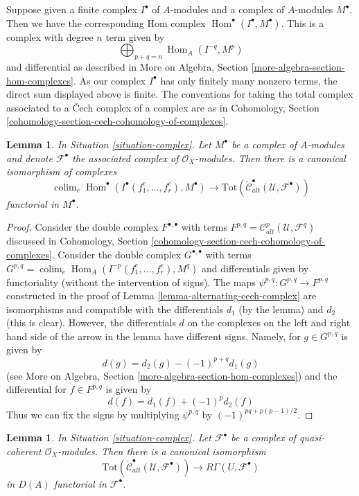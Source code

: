 \documentclass{stacks-project}
\theoremstyle{plain}
\newtheorem{lemma}[subsection]{Lemma}
\theoremstyle{definition}
\theoremstyle{remark}
\numberwithin{equation}{subsection}
\def\colim{\mathop{\mathrm{colim}}\nolimits}
\def\Hom{\mathop{\mathrm{Hom}}\nolimits}
\begin{document}
\noindent
Suppose given a finite complex $I^\bullet$ of $A$-modules and a
complex of $A$-modules $M^\bullet$. Then we have the corresponding
Hom complex $\Hom^\bullet(I^\bullet, M^\bullet)$. This is a complex
with degree $n$ term given by
$$
\bigoplus\nolimits_{p + q = n} \Hom_A(I^{-q}, M^p)
$$
and differential as described in More on Algebra, Section
\ref{more-algebra-section-hom-complexes}.
As our complex $I^\bullet$ has only finitely many nonzero terms, the
direct sum displayed above is finite.
The conventions for taking the total complex associated to a
{\v C}ech complex of a complex are as in
Cohomology, Section \ref{cohomology-section-cech-cohomology-of-complexes}.

\begin{lemma}
\label{lemma-alternating-cech-complex-complex}
In Situation \ref{situation-complex}. Let $M^\bullet$ be a
complex of $A$-modules and
denote $\mathcal{F}^\bullet$ the associated complex of
$\mathcal{O}_X$-modules. Then
there is a canonical isomorphism of complexes
$$
\colim_e \Hom^\bullet(I^\bullet(f_1^e, \ldots, f_r^e), M^\bullet)
\longrightarrow
\text{Tot}(\check{\mathcal{C}}_{alt}^\bullet(\mathcal{U}, \mathcal{F}^\bullet))
$$
functorial in $M^\bullet$.
\end{lemma}

\begin{proof}
Consider the double complex $F^{\bullet, \bullet}$ with terms
$F^{p, q} = \mathcal{C}_{alt}^p(\mathcal{U}, \mathcal{F}^q)$
discussed in
Cohomology, Section \ref{cohomology-section-cech-cohomology-of-complexes}.
Consider the double complex $G^{\bullet, \bullet}$ with terms
$G^{p, q} = \colim_e \Hom_A(I^{-p}(f_1^e, \ldots, f_r^e), M^q)$ and
differentials given by functoriality (without the intervention
of signs). The maps $\psi^{p, q} : G^{p, q} \to F^{p, q}$
constructed in the proof of Lemma \ref{lemma-alternating-cech-complex}
are isomorphisms and compatible with the differentials $d_1$ (by the lemma)
and $d_2$ (this is clear). However, the differentials $d$ on the
complexes on the left and right hand side of the arrow in the lemma
have different signs. Namely, for $g \in G^{p, q}$ is given by
$$
d(g) =  d_2(g) - (-1)^{p + q} d_1(g) 
$$
(see More on Algebra, Section \ref{more-algebra-section-hom-complexes})
and the differential for $f \in F^{p, q}$ is given by
$$
d(f) = d_1(f) + (-1)^p d_2(f)
$$
Thus we can fix the signs by multiplying $\psi^{p, q}$ by
$(-1)^{pq + p(p - 1)/2}$.
\end{proof}

\begin{lemma}
\label{lemma-alternating-cech-complex-complex-computes-cohomology}
In Situation \ref{situation-complex}. Let $\mathcal{F}^\bullet$
be a complex of quasi-coherent $\mathcal{O}_X$-modules. Then
there is a canonical isomorphism
$$
\text{Tot}(\check{\mathcal{C}}_{alt}^\bullet(\mathcal{U}, \mathcal{F}^\bullet))
\longrightarrow
R\Gamma(U, \mathcal{F}^\bullet)
$$
in $D(A)$ functorial in $\mathcal{F}^\bullet$.
\end{lemma}
\end{document}
